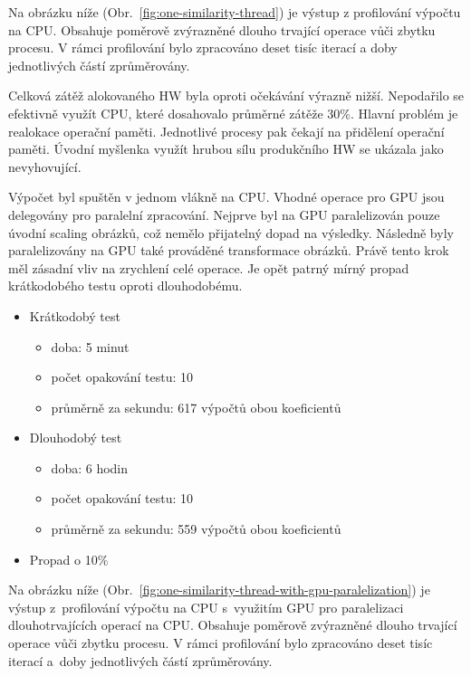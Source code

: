 Na obrázku níže (Obr.~\ref{fig:one-similarity-thread}) je výstup z profilování výpočtu na CPU. Obsahuje poměrově zvýrazněné dlouho trvající operace vůči zbytku procesu. V rámci profilování bylo zpracováno deset tisíc iterací a doby jednotlivých částí zprůměrovány.

Celková zátěž alokovaného HW byla oproti očekávání výrazně nižší. Nepodařilo se efektivně využít CPU, které dosahovalo průměrné zátěže 30\%. Hlavní problém je realokace operační paměti. Jednotlivé procesy pak čekají na přidělení operační paměti. Úvodní myšlenka využít hrubou sílu produkčního HW se ukázala jako nevyhovující.

Výpočet byl spuštěn v jednom vlákně na CPU. Vhodné operace pro GPU jsou delegovány pro paralelní zpracování.
Nejprve byl na GPU paralelizován pouze úvodní scaling obrázků, což nemělo přijatelný dopad na výsledky. Následně byly paralelizovány na GPU také prováděné transformace obrázků. Právě tento krok měl zásadní vliv na zrychlení celé operace.
Je opět patrný mírný propad krátkodobého testu oproti dlouhodobému.
\begin{itemize}
	\setlength{\parskip}{0pt}
	\setlength{\itemsep}{0pt}
	\item {Krátkodobý test}
		\begin{itemize}
			\setlength{\parskip}{0pt}
			\setlength{\itemsep}{0pt}
			\item {doba: 5 minut}
			\item {počet opakování testu: 10}
			\item {průměrně za sekundu: 617 výpočtů obou koeficientů}
		\end{itemize}
	\item {Dlouhodobý test}
		\begin{itemize}
			\setlength{\parskip}{0pt}
			\setlength{\itemsep}{0pt}
			\item {doba: 6 hodin}
			\item {počet opakování testu: 10}
			\item {průměrně za sekundu: 559 výpočtů obou koeficientů}
		\end{itemize}
	\item {Propad o 10\%}
\end{itemize}

Na obrázku níže (Obr.~\ref{fig:one-similarity-thread-with-gpu-paralelization}) je výstup z~profilování výpočtu na CPU s~využitím GPU pro paralelizaci dlouhotrvajících operací na CPU. Obsahuje poměrově zvýrazněné dlouho trvající operace vůči zbytku procesu. V rámci profilování bylo zpracováno deset tisíc iterací a~doby jednotlivých částí zprůměrovány.

